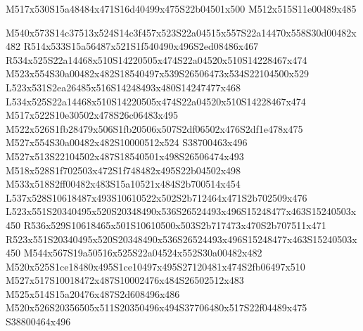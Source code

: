 \documentclass{article}
\begin{document}
\begin{multicols}{2}
\begin{center}
M517x530S15a48484x471S16d40499x475S22b04501x500 M512x515S11e00489x485 
\end{center}









M540x573S14c37513x524S14c3f457x523S22a04515x557S22a14470x558S30d00482x482 R514x533S15a56487x521S1f540490x496S2ed08486x467 R534x525S22a14468x510S14220505x474S22a04520x510S14228467x474 M523x554S30a00482x482S18540497x539S26506473x534S22104500x529 L523x531S2ea26485x516S14248493x480S14247477x468 L534x525S22a14468x510S14220505x474S22a04520x510S14228467x474 M517x522S10e30502x478S26c06483x495 M522x526S1fb28479x506S1fb20506x507S2df06502x476S2df1e478x475 M527x554S30a00482x482S10000512x524 S38700463x496 M527x513S22104502x487S18540501x498S26506474x493 M518x528S1f702503x472S1f748482x495S22b04502x498 M533x518S2ff00482x483S15a10521x484S2b700514x454 L537x528S10618487x493S10610522x502S2b712464x471S2b702509x476 L523x551S20340495x520S20348490x536S26524493x496S15248477x463S15240503x450 R536x529S10618465x501S10610500x503S2b717473x470S2b707511x471 R523x551S20340495x520S20348490x536S26524493x496S15248477x463S15240503x450 M544x567S19a50516x525S22a04524x552S30a00482x482 M520x525S1ce18480x495S1ce10497x495S27120481x474S2fb06497x510 M527x517S10018472x487S10002476x484S26502512x483 M525x514S15a20476x487S2d608496x486 M520x526S20356505x511S20350496x494S37706480x517S22f04489x475 S38800464x496


\end{multicols}
\end{document}
